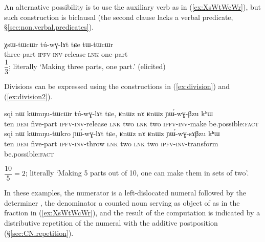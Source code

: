 An alternative possibility is to use the auxiliary verb  as in (\ref{ex:XsWtWcWr}), but such construction is biclausal (the second clause lacks a verbal predicate, §\ref{sec:non.verbal.predicates}).

\begin{exe}
\ex \label{ex:XsWtWcWr}
\gll χsɯ-tɯcɯr tú-wɣ-lɤt tɕe tɯ-tɯcɯr   \\
 three-part \textsc{ipfv}-\textsc{inv}-release \textsc{lnk} one-part \\
\glt $\dfrac{1}{3}$; literally `Making three parts, one part.' (elicited)
\end{exe}

Divisions can be expressed using the constructions in  (\ref{ex:division}) and (\ref{ex:division2}).

\begin{exe}
\ex
\begin{xlist}
\ex \label{ex:division}
\gll sqi nɯ kɯmŋu-tɯcɯr tú-wɣ-lɤt tɕe, ʁnɯz nɤ ʁnɯz ɲɯ́-wɣ-βzu kʰɯ \\
 ten \textsc{dem} five-part \textsc{ipfv}-\textsc{inv}-release \textsc{lnk} two \textsc{lnk} two \textsc{ipfv}-\textsc{inv}-make be.possible:\textsc{fact} \\
 \ex \label{ex:division2}
\gll sqi nɯ kɯmŋu-tɯkro ɲɯ́-wɣ-lɤt tɕe, ʁnɯz nɤ ʁnɯz ɲɯ́-wɣ-sɤβzu kʰɯ \\
 ten \textsc{dem} five-part \textsc{ipfv}-\textsc{inv}-throw \textsc{lnk} two \textsc{lnk} two \textsc{ipfv}-\textsc{inv}-transform be.possible:\textsc{fact} \\
 \end{xlist}
\glt $\dfrac{10}{5}=2$; literally `Making 5 parts out of 10, one can make them in sets of two'.
\end{exe}

In these examples, the numerator is a left-dislocated numeral followed by the determiner , the denominator a counted noun serving as object of  as in the fraction in (\ref{ex:XsWtWcWr}), and the result of the computation is indicated by a distributive repetition of the numeral with the additive postposition  (§\ref{sec:CN.repetition}).
 
